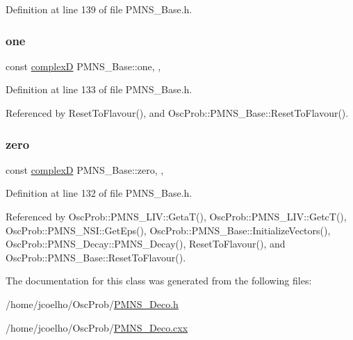 Definition at line 139 of file P\+M\+N\+S\+\_\+\+Base.\+h.

\mbox{\label{classOscProb_1_1PMNS__Base_a7d1d0bbcab30a1fd8c368c40134c51ff}} 
\subsubsection{\texorpdfstring{one}{one}}
{\footnotesize\ttfamily const \hyperlink{EigenPoint_8h_a67ca8e107e20610c3fff78d5e726ece0}{complexD} P\+M\+N\+S\+\_\+\+Base\+::one\hspace{0.3cm}{\ttfamily [static]}, {\ttfamily [protected]}, {\ttfamily [inherited]}}



Definition at line 133 of file P\+M\+N\+S\+\_\+\+Base.\+h.



Referenced by Reset\+To\+Flavour(), and Osc\+Prob\+::\+P\+M\+N\+S\+\_\+\+Base\+::\+Reset\+To\+Flavour().

\mbox{\label{classOscProb_1_1PMNS__Base_a05e595848c2521dc795efa7645728b94}} 
\subsubsection{\texorpdfstring{zero}{zero}}
{\footnotesize\ttfamily const \hyperlink{EigenPoint_8h_a67ca8e107e20610c3fff78d5e726ece0}{complexD} P\+M\+N\+S\+\_\+\+Base\+::zero\hspace{0.3cm}{\ttfamily [static]}, {\ttfamily [protected]}, {\ttfamily [inherited]}}



Definition at line 132 of file P\+M\+N\+S\+\_\+\+Base.\+h.



Referenced by Osc\+Prob\+::\+P\+M\+N\+S\+\_\+\+L\+I\+V\+::\+Geta\+T(), Osc\+Prob\+::\+P\+M\+N\+S\+\_\+\+L\+I\+V\+::\+Getc\+T(), Osc\+Prob\+::\+P\+M\+N\+S\+\_\+\+N\+S\+I\+::\+Get\+Eps(), Osc\+Prob\+::\+P\+M\+N\+S\+\_\+\+Base\+::\+Initialize\+Vectors(), Osc\+Prob\+::\+P\+M\+N\+S\+\_\+\+Decay\+::\+P\+M\+N\+S\+\_\+\+Decay(), Reset\+To\+Flavour(), and Osc\+Prob\+::\+P\+M\+N\+S\+\_\+\+Base\+::\+Reset\+To\+Flavour().



The documentation for this class was generated from the following files\+:\begin{DoxyCompactItemize}
\item 
/home/jcoelho/\+Osc\+Prob/\hyperlink{PMNS__Deco_8h}{P\+M\+N\+S\+\_\+\+Deco.\+h}\item 
/home/jcoelho/\+Osc\+Prob/\hyperlink{PMNS__Deco_8cxx}{P\+M\+N\+S\+\_\+\+Deco.\+cxx}\end{DoxyCompactItemize}
